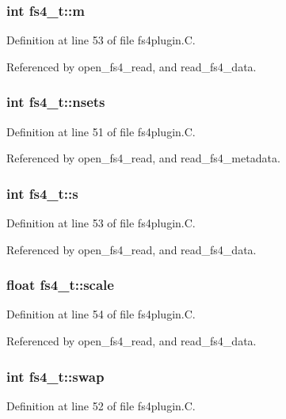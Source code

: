 \subsubsection{\setlength{\rightskip}{0pt plus 5cm}int fs4\_\-t::m}\label{structfs4__t_m4}




Definition at line 53 of file fs4plugin.C.

Referenced by open\_\-fs4\_\-read, and read\_\-fs4\_\-data.
\subsubsection{\setlength{\rightskip}{0pt plus 5cm}int fs4\_\-t::nsets}\label{structfs4__t_m1}




Definition at line 51 of file fs4plugin.C.

Referenced by open\_\-fs4\_\-read, and read\_\-fs4\_\-metadata.
\subsubsection{\setlength{\rightskip}{0pt plus 5cm}int fs4\_\-t::s}\label{structfs4__t_m5}




Definition at line 53 of file fs4plugin.C.

Referenced by open\_\-fs4\_\-read, and read\_\-fs4\_\-data.
\subsubsection{\setlength{\rightskip}{0pt plus 5cm}float fs4\_\-t::scale}\label{structfs4__t_m9}




Definition at line 54 of file fs4plugin.C.

Referenced by open\_\-fs4\_\-read, and read\_\-fs4\_\-data.
\subsubsection{\setlength{\rightskip}{0pt plus 5cm}int fs4\_\-t::swap}\label{structfs4__t_m2}




Definition at line 52 of file fs4plugin.C.

